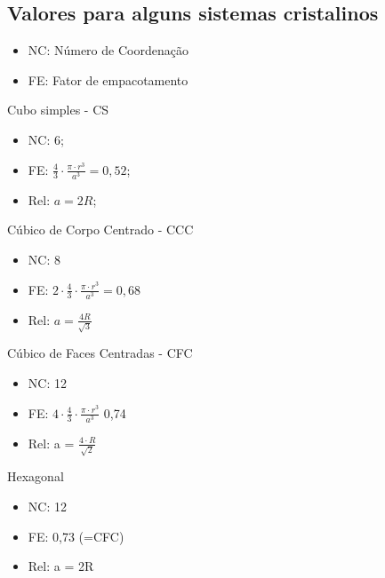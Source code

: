 \subsection*{Valores para alguns sistemas cristalinos}

\begin{itemize}
	\setlength{\parskip}{0pt}
	\setlength{\itemsep}{0pt plus 1pt}
	
	\item NC: Número de Coordenação
	\item FE: Fator de empacotamento
\end{itemize}


Cubo simples - CS




\begin{itemize}
	\item NC: 6;
	\item FE: $\frac{4}{3} \cdot \frac{\pi \cdot r^{3}}{a^{3}} = 0,52$;
	\item Rel: $a = 2R$;	
\end{itemize}


Cúbico de Corpo Centrado - CCC

\begin{itemize}
	\item NC: 8
	\item FE: $2 \cdot \frac{4}{3} \cdot \frac{\pi \cdot r^{3}}{a^{3}} = 0,68$
	\item Rel: $a = \frac{4R}{\sqrt{3}}$
\end{itemize}


Cúbico de Faces Centradas - CFC

\begin{itemize}
	\setlength{\parskip}{0pt}
	\setlength{\itemsep}{0pt plus 1pt}
	
	\item NC: 12
	\item FE: $4 \cdot \frac{4}{3} \cdot \frac{\pi \cdot r^{3}}{a^{3}}$ 0,74
	\item Rel: a = $\frac{4 \cdot R}{\sqrt{2}}$
\end{itemize}

Hexagonal

\begin{itemize}
	
	\setlength{\parskip}{0pt}
	\setlength{\itemsep}{0pt plus 1pt}
	
	\item NC: 12
	\item FE: 0,73 (=CFC)
	\item Rel: a = 2R
\end{itemize}


